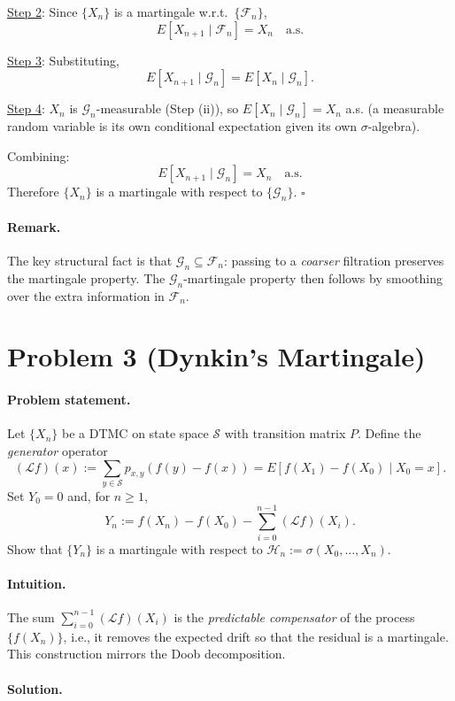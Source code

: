 \documentclass[11pt]{article}
\newcommand{\F}{\mathcal{F}}
\newcommand{\G}{\mathcal{G}}
\newcommand{\1}{\mathbf{1}}
\theoremstyle{plain}
\begin{document}
\underline{Step 2}: Since $\{X_n\}$ is a martingale w.r.t.\ $\{\F_n\}$,
\[
  E[X_{n+1}\mid\F_n] = X_n\quad\text{a.s.}
\]

\underline{Step 3}: Substituting,
\[
  E[X_{n+1}\mid\G_n]
  = E[X_n\mid\G_n].
\]

\underline{Step 4}: $X_n$ is $\G_n$-measurable (Step (ii)), so
$E[X_n\mid\G_n]=X_n$ a.s. (a measurable random variable is its own conditional
expectation given its own $\sigma$-algebra).

Combining:
\[
  E[X_{n+1}\mid\G_n] = X_n\quad\text{a.s.}
\]
Therefore $\{X_n\}$ is a martingale with respect to $\{\G_n\}$. $\square$

\paragraph{Remark.}
The key structural fact is that $\G_n\subseteq\F_n$: passing to a \emph{coarser}
filtration preserves the martingale property. The $\G_n$-martingale property then
follows by smoothing over the extra information in $\F_n$.

\section*{Problem 3 (Dynkin's Martingale)}

\paragraph{Problem statement.}
Let $\{X_n\}$ be a DTMC on state space $\mathcal{S}$ with transition matrix $P$.
Define the \emph{generator} operator
\[
  (\mathcal{L}f)(x) := \sum_{y\in\mathcal{S}}p_{x,y}(f(y)-f(x))
  = E[f(X_1)-f(X_0)\mid X_0=x].
\]
Set $Y_0=0$ and, for $n\ge1$,
\[
  Y_n := f(X_n) - f(X_0) - \sum_{i=0}^{n-1}(\mathcal{L}f)(X_i).
\]
Show that $\{Y_n\}$ is a martingale with respect to $\mathcal{H}_n:=\sigma(X_0,\ldots,X_n)$.

\paragraph{Intuition.}
The sum $\sum_{i=0}^{n-1}(\mathcal{L}f)(X_i)$ is the \emph{predictable compensator}
of the process $\{f(X_n)\}$, i.e., it removes the expected drift so that the
residual is a martingale. This construction mirrors the Doob decomposition.

\paragraph{Solution.}
\end{document}
